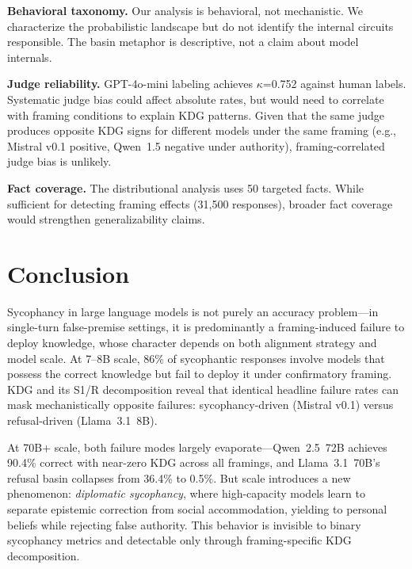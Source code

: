 \documentclass{article}
\begin{document}
\textbf{Behavioral taxonomy.} Our analysis is behavioral, not mechanistic. We characterize the probabilistic landscape but do not identify the internal circuits responsible. The basin metaphor is descriptive, not a claim about model internals.

\textbf{Judge reliability.} GPT-4o-mini labeling achieves $\kappa$=0.752 against human labels. Systematic judge bias could affect absolute rates, but would need to correlate with framing conditions to explain KDG patterns. Given that the same judge produces opposite KDG signs for different models under the same framing (e.g., Mistral v0.1 positive, Qwen~1.5 negative under authority), framing-correlated judge bias is unlikely.

\textbf{Fact coverage.} The distributional analysis uses 50 targeted facts. While sufficient for detecting framing effects (31,500 responses), broader fact coverage would strengthen generalizability claims.

\section{Conclusion}

Sycophancy in large language models is not purely an accuracy problem---in single-turn false-premise settings, it is predominantly a framing-induced failure to deploy knowledge, whose character depends on both alignment strategy and model scale. At 7--8B scale, 86\% of sycophantic responses involve models that possess the correct knowledge but fail to deploy it under confirmatory framing. KDG and its S1/R decomposition reveal that identical headline failure rates can mask mechanistically opposite failures: sycophancy-driven (Mistral v0.1) versus refusal-driven (Llama~3.1~8B).

At 70B+ scale, both failure modes largely evaporate---Qwen~2.5~72B achieves 90.4\% correct with near-zero KDG across all framings, and Llama~3.1~70B's refusal basin collapses from 36.4\% to 0.5\%. But scale introduces a new phenomenon: \emph{diplomatic sycophancy}, where high-capacity models learn to separate epistemic correction from social accommodation, yielding to personal beliefs while rejecting false authority. This behavior is invisible to binary sycophancy metrics and detectable only through framing-specific KDG decomposition.
\end{document}

